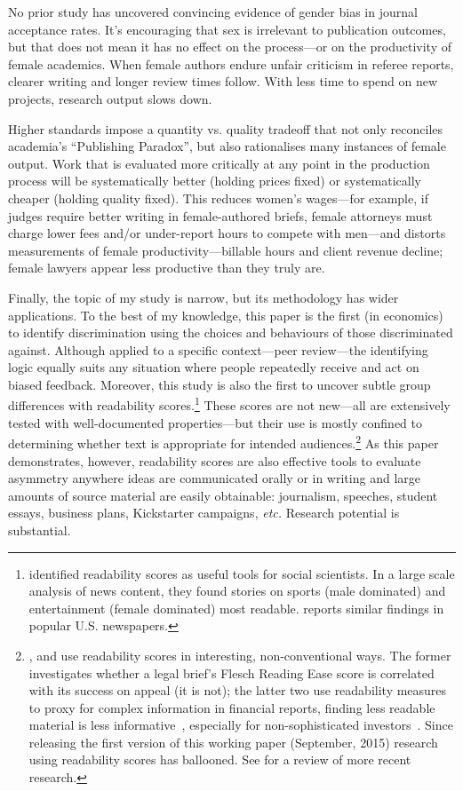 No prior study has uncovered convincing evidence of gender bias in journal acceptance rates. It's encouraging that sex is irrelevant to publication outcomes, but that does not mean it has no effect on the process---or on the productivity of female academics. When female authors endure unfair criticism in referee reports, clearer writing and longer review times follow. With less time to spend on new projects, research output slows down.

Higher standards impose a quantity vs. quality tradeoff that not only reconciles academia's ``Publishing Paradox'', but also rationalises many instances of female output. Work that is evaluated more critically at any point in the production process will be systematically better (holding prices fixed) or systematically cheaper (holding quality fixed). This reduces women's wages---for example, if judges require better writing in female-authored briefs, female attorneys must charge lower fees and\slash or under-report hours to compete with men---and distorts measurements of female productivity---billable hours and client revenue decline; female lawyers appear less productive than they truly are.

Finally, the topic of my study is narrow, but its methodology has wider applications. To the best of my knowledge, this paper is the first (in economics) to identify discrimination using the choices and behaviours of those discriminated against. Although applied to a specific context---peer review---the identifying logic equally suits any situation where people repeatedly receive and act on biased feedback. Moreover, this study is also the first to uncover subtle group differences with readability scores.\footnote{\label{footnote81} \citet{Ali2010} identified readability scores as useful tools for social scientists. In a large scale analysis of news content, they found stories on sports (male dominated) and entertainment (female dominated) most readable.  \citet{Stempel1981} reports similar findings in popular U.S. newspapers.} These scores are not new---all are extensively tested with well-documented properties---but their use is mostly confined to determining whether text is appropriate for intended audiences.\footnote{\label{footnote82} \citet{Long2011},  \citet{Lehavy2011} and  \citet{Thörnqvist2015} use readability scores in interesting, non-conventional ways. The former investigates whether a legal brief's Flesch Reading Ease score is correlated with its success on appeal (it is not); the latter two use readability measures to proxy for complex information in financial reports, finding less readable material is less informative~\citep{Lehavy2011}, especially for non-sophisticated investors~\citep{Thörnqvist2015}. Since releasing the first version of this working paper (September, 2015) research using readability scores has ballooned. See \citet{Benoit2017} for a review of more recent research.} As this paper demonstrates, however, readability scores are also effective tools to evaluate asymmetry anywhere ideas are communicated orally or in writing and large amounts of source material are easily obtainable: journalism, speeches, student essays, business plans, Kickstarter campaigns, \emph{etc.} Research potential is substantial.


